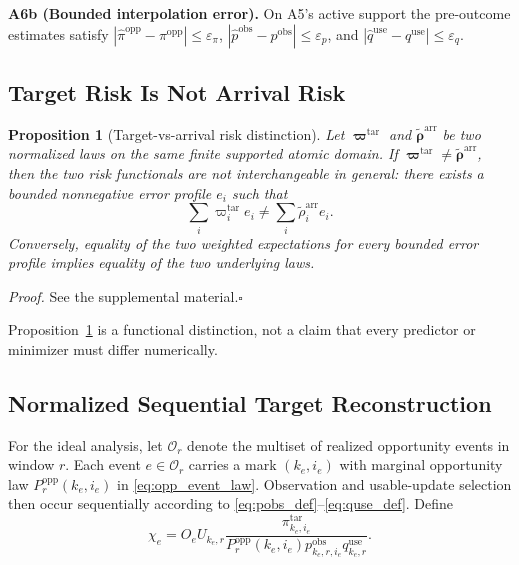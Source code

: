 \documentclass[letterpaper,journal]{IEEEtran}
\newtheorem{proposition}{Proposition}
\begin{document}
\noindent\textbf{A6b (Bounded interpolation error).}
On A5's active support the pre-outcome estimates satisfy
$|\widehat\pi^{\mathrm{opp}}-\pi^{\mathrm{opp}}|\le\varepsilon_\pi$,
$|\widehat p^{\mathrm{obs}}-p^{\mathrm{obs}}|\le\varepsilon_p$, and
$|\widehat q^{\mathrm{use}}-q^{\mathrm{use}}|\le\varepsilon_q$.

\subsection{Target Risk Is Not Arrival Risk}
\label{subsec:prop_risk}

\begin{proposition}[Target-vs-arrival risk distinction]
\label{prop:risk}
Let $\boldsymbol\varpi^{\mathrm{tar}}$ and
$\widetilde{\boldsymbol\rho}^{\mathrm{arr}}$ be two normalized laws on the same
finite supported atomic domain.  If
$\boldsymbol\varpi^{\mathrm{tar}}\neq\widetilde{\boldsymbol\rho}^{\mathrm{arr}}$,
then the two risk functionals are not interchangeable in general: there exists
a bounded nonnegative error profile $e_i$ such that
\begin{equation}
 \sum_i
 \varpi_i^{\mathrm{tar}}e_i
 \neq
 \sum_i
 \widetilde\rho_i^{\mathrm{arr}}e_i.
 \label{eq:prop1_nonidentity}
\end{equation}
Conversely, equality of the two weighted expectations for every bounded error
profile implies equality of the two underlying laws.
\end{proposition}

\noindent\emph{Proof.}
See the supplemental material.\hfill$\square$

Proposition~\ref{prop:risk} is a functional distinction, not a claim that
every predictor or minimizer must differ numerically.

\subsection{Normalized Sequential Target Reconstruction}
\label{subsec:prop_reconstruction}

For the ideal analysis, let $\mathcal{O}_r$ denote the multiset of realized
opportunity events in window $r$.  Each event $e\in\mathcal{O}_r$ carries a
mark $(k_e,i_e)$ with marginal opportunity law
$P_r^{\mathrm{opp}}(k_e,i_e)$ in \eqref{eq:opp_event_law}.  Observation and
usable-update selection then occur sequentially according to
\eqref{eq:pobs_def}--\eqref{eq:quse_def}.  Define
\begin{equation}
 \chi_e
 =
 O_e U_{k_e,r}
 \frac{
 \pi^{\mathrm{tar}}_{k_e,i_e}
 }{
 P_r^{\mathrm{opp}}(k_e,i_e)
 p^{\mathrm{obs}}_{k_e,r,i_e}
 q^{\mathrm{use}}_{k_e,r}
 }.
 \label{eq:chi_event}
\end{equation}
\end{document}
